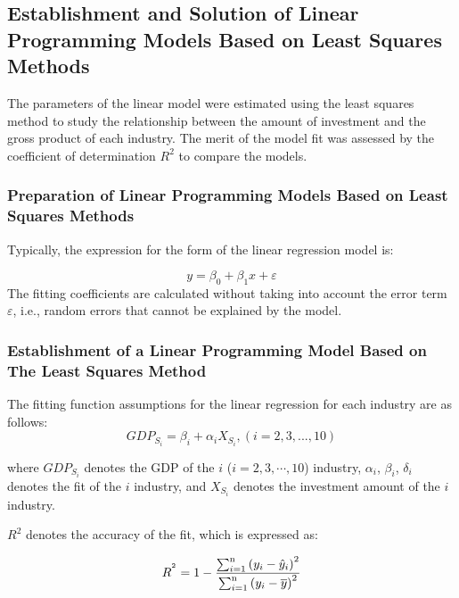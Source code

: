 \documentclass[12pt]{article}  %
\begin{document}
\subsection{Establishment and Solution of Linear Programming Models Based on Least Squares Methods}

	The parameters of the linear model were estimated using the least squares method to study the relationship between the amount of investment and the gross product of each industry. The merit of the model fit was assessed by the coefficient of determination $R^2$ to compare the models.

\subsubsection{Preparation of Linear Programming Models Based on Least Squares Methods} 
	Typically, the expression for the form of the linear regression model is:
	
	\begin{equation}
		y = {\beta _0} + {\beta _1}x + \varepsilon
	\end{equation}
	The fitting coefficients are calculated without taking into account the error term $ \varepsilon $, i.e., random errors that cannot be explained by the model.
	

\subsubsection{Establishment of a Linear Programming Model Based on The Least Squares Method}

	The fitting function assumptions for the linear regression for each industry are as follows:
	\begin{equation}
		GD{P_{{S_i}}} = {\beta _i} + {\alpha _i}{X_{{S_i}}}, (i = 2,3,...,10)
	\end{equation}

	where $GDP_{S_i}$ denotes the GDP of the $i$ ($i = 2, 3, \cdots, 10 $) industry, $\alpha_i$, $\beta_i$, ${\delta_i}$ denotes the fit of the $i$ industry, and $X_{S_i}$ denotes the investment amount of the $i$ industry.
	
	$R^2$ denotes the accuracy of the fit, which is expressed as:
	
	\begin{equation}
	{R^{^2}} = 1 - \frac{{\sum\nolimits_{i = 1}^{\rm{n}} {{{({y_i} - {{\hat y}_i})}^2}} }}{{\sum\nolimits_{i = 1}^{\rm{n}} {{{({y_i} - \overline y )}^2}} }}
	\end{equation}
\end{document}
